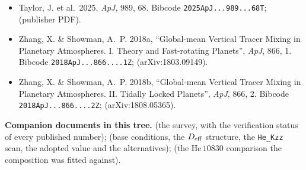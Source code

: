 \documentclass[english,a4paper]{my_memo}
\begin{document}
\begin{itemize}
\item Taylor, J. et al.\ 2025, \textit{ApJ}, 989, 68.
Bibcode \texttt{2025ApJ...989...68T};
 (publisher PDF).

\item Zhang, X. \& Showman, A.~P. 2018a, ``Global-mean Vertical Tracer Mixing
in Planetary Atmospheres. I. Theory and Fast-rotating Planets'',
\textit{ApJ}, 866, 1. Bibcode \texttt{2018ApJ...866....1Z};
(arXiv:1803.09149).

\item Zhang, X. \& Showman, A.~P. 2018b, ``Global-mean Vertical Tracer
Mixing in Planetary Atmospheres. II. Tidally Locked Planets'',
\textit{ApJ}, 866, 2. Bibcode \texttt{2018ApJ...866....2Z};
(arXiv:1808.05365).

\end{itemize}

\medskip
\noindent\textbf{Companion documents in this tree.}
 (the survey, with the verification
status of every published number);
 (base conditions, the $D_{\rm eff}$
structure, the \texttt{He\_Kzz} scan, the adopted value and the
alternatives); 
(the He\,$10830$ comparison the composition was fitted against).
\end{document}
